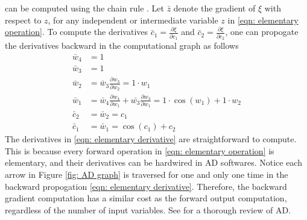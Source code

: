 can be computed using the chain rule \cite{AD review}. 
Let $\bar{z}$ 
denote the gradient of $\xi$ with respect to $z$, for any independent or intermediate
variable $z$ in \eqref{eqn: elementary operation}.
To compute the derivatives $\bar{c}_1 = \frac{\partial \xi}{\partial c_1}$ and
$\bar{c}_2 = \frac{\partial \xi}{\partial c_2}$,
one can propogate the derivatives backward in the computational graph as follows
\begin{equation}\begin{split}
    \bar{w}_4 & = 1\\
    \bar{w}_3& =1\\
    \bar{w}_2 & = \bar{w}_3 \frac{\partial w_3}{\partial w_2} = 1\cdot w_1\\
    \bar{w}_1 & = \bar{w}_4 \frac{\partial w_4}{\partial w_1} + \bar{w_3} 
                  \frac{\partial w_3}{\partial w_1} = 1\cdot \cos(w_1) +1\cdot w_2\\
    \bar{c}_2 &= \bar{w}_2 = c_1\\
    \bar{c}_1 &= \bar{w}_1 = \cos(c_1) + c_2
\end{split}
\label{eqn: elementary derivative}
\end{equation}
The derivatives in \eqref{eqn: elementary derivative} are straightforward to compute.
This is because every forward operation in \eqref{eqn: elementary operation} is elementary, and
their derivatives can be hardwired in AD softwares. 
Notice each arrow in Figure \ref{fig: AD graph} is traversed for one and only one time in the backward propogation 
\eqref{eqn: elementary derivative}. Therefore, the backward
gradient computation has a similar cost as the forward output computation, regardless of
the number of input variables. 
See \cite{AD review} for a thorough review of AD.\\

